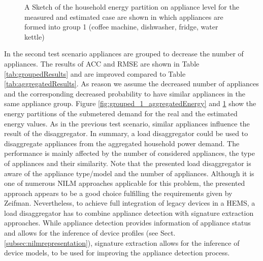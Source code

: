 \documentclass{article}
\newcommand{\pie}[3][]{
    \begin{scope}[#1]
    \pgfmathsetmacro{\curA}{90}
    \pgfmathsetmacro{\r}{1}
    \def\c{(0,0)}
    \node[pie title] at (90:1.3) {#2};
    \foreach \v/\s in{#3}{
        \pgfmathsetmacro{\deltaA}{\v/100*360}
        \pgfmathsetmacro{\nextA}{\curA + \deltaA}
        \pgfmathsetmacro{\midA}{(\curA+\nextA)/2}

        \path[slice,\s] \c
            -- +(\curA:\r)
            arc (\curA:\nextA:\r)
            -- cycle;
        \pgfmathsetmacro{\d}{max((\deltaA * -(.5/50) + 1) , .5)}

        \begin{pgfonlayer}{foreground}
        \path \c -- node[pos=\d,pie values,values of \s]{$\v\%$} +(\midA:\r);
        \end{pgfonlayer}

        \global\let\curA\nextA
    }
    \end{scope}
}
\newcommand{\legend}[2][]{
    \begin{scope}[#1]
    \path
        \foreach \n/\s in {#2}
            {
                  ++(0,-10pt) node[\s,legend box] {} +(5pt,0) node[legend label] {\n}
            }
    ;
    \end{scope}
}
\begin{document}
\begin{figure}
\caption{A Sketch of the household energy partition on appliance level for the measured and estimated case are shown in which appliances are formed into group 1 (coffee machine, dishwasher, fridge, water kettle)}
\label{fig:grouped_2_aggregatedEnergy}
\end{figure}
In the second test scenario appliances are grouped to decrease the number of appliances.
The results of \ac{ACC} and \ac{RMSE} are shown in Table \ref{tab:groupedResults} and are improved compared to Table \ref{tab:aggregatedResults}.
As reason we assume the decreased number of appliances and the corresponding decreased probability to have similar appliances in the same appliance group.
Figure \ref{fig:grouped_1_aggregatedEnergy} and \ref{fig:grouped_2_aggregatedEnergy} show the energy partitions of the submetered demand for the real and the estimated energy values.
As in the previous test scenario, similar appliances influence the result of the disaggregator.
In summary, a load disaggregator could be used to disaggregate appliances from the aggregated household power demand.
The performance is mainly affected by the number of considered appliances, the type of appliances and their similarity.
Note that the presented load disaggregator is aware of the appliance type/model and the number of appliances.
Although it is one of numerous \ac{NILM} approaches applicable for this problem, the presented approach appears to be a good choice fulfilling the requirements given by Zeifman.
Nevertheless, to achieve full integration of legacy devices in a \ac{HEMS}, a load disaggregator has to combine appliance detection with signature extraction approaches.
While appliance detection provides information of appliance status and allows for the inference of device profiles (see Sect. \ref{subsec:nilmrepresentation}),
signature extraction allows for the inference of device models, to be used for improving the appliance detection process.
\end{document}
